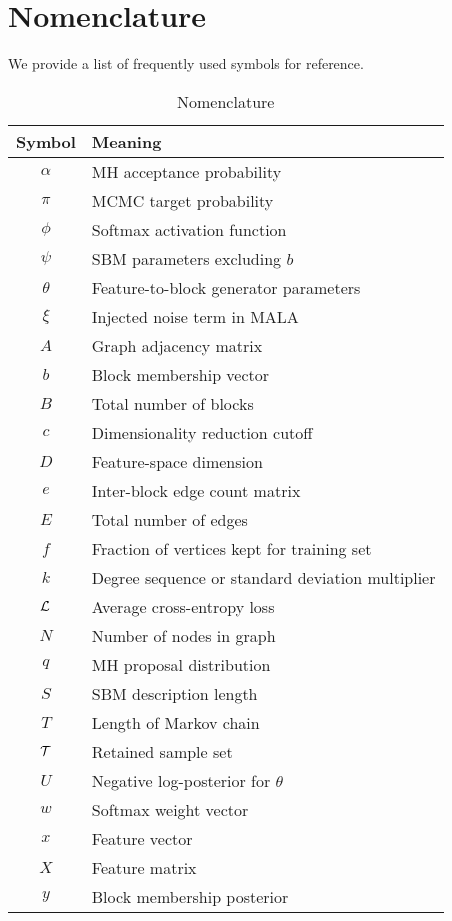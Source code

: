 \section*{Nomenclature}

We provide a list of frequently used symbols for reference.

\begin{table}[!h]
	\centering
	\caption{Nomenclature}
	\label{tab:nomenclature}
	\begin{tabular}{c|l}
			  Symbol & Meaning \\ \hline
			  $\alpha$ & MH acceptance probability\\
			  $\pi$ & MCMC target probability \\
			  $\phi$ & Softmax activation function \\
			  $\psi$ & SBM parameters excluding $b$ \\
			  $\theta$ & Feature-to-block generator parameters \\
			  $\xi$ & Injected noise term in MALA\\
			  $A$ & Graph adjacency matrix \\
			  $b$ & Block membership vector\\
			  $B$ & Total number of blocks \\
			  $c$ & Dimensionality reduction cutoff \\
			  $D$ & Feature-space dimension \\
			  $e$ & Inter-block edge count matrix \\
			  $E$ & Total number of edges \\
			  $f$ & Fraction of vertices kept for training set\\
			  $k$ & Degree sequence or standard deviation multiplier\\
			  $\mathcal{L}$ & Average cross-entropy loss\\
			  $N$ & Number of nodes in graph \\
			  $q$ & MH proposal distribution\\
			  $S$ & SBM description length\\
			  $T$ & Length of Markov chain\\
			  $\mathcal{T}$ & Retained sample set\\
			  $U$ & Negative log-posterior for $\theta$ \\
			  $w$ & Softmax weight vector\\
			  $x$ & Feature vector \\
			  $X$ & Feature matrix \\
			  $y$ & Block membership posterior \\
	\end{tabular}
\end{table}